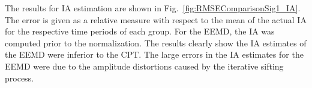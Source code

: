 \documentclass[a4paper]{IEEEtran}
\begin{document}
The results for IA estimation are shown in Fig.~\ref{fig:RMSEComparisonSig1_IA}. The error is given as a relative measure with respect to the mean of the actual IA for the respective time periods of each group. For the EEMD, the IA was computed prior to the normalization. The results clearly show the IA estimates of the EEMD were inferior to the CPT. The large errors in the IA estimates for the EEMD were due to the amplitude distortions caused by the iterative sifting process.
\begin{figure}[ht]
	\centering

\end{figure}
\end{document}

